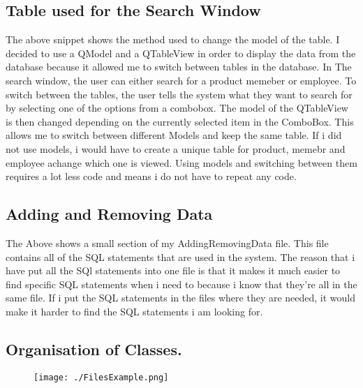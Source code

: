 \subsection{Table used for the Search Window}
\begin{figure}[H]
\end{figure}

The above snippet shows the method used to change the model of the table. I decided to use a QModel and a QTableView in order to display the data from the database because it allowed me to switch between tables in the database. In The search window, the user can either search for a product memeber or employee. To switch between the tables, the user tells the system what they want to search for by selecting one of the options from a combobox. The model of the QTableView is then changed depending on the currently selected item in the ComboBox. This allows me to switch between different Models and keep the same table. If i did not use models, i would have to create a unique table for product, memebr and employee achange which one is viewed. Using models and switching between them requires a lot less code and means i do not have to repeat any code.

\subsection{Adding and Removing Data}
\begin{figure}[H]
\end{figure}

The Above shows a small section of my AddingRemovingData file. This file contains all of the SQL statements that are used in the system. The reason that i have put all the SQl statements into one file is that it makes it much easier to find specific SQL statements when i need to because i know that they're all in the same file. If i put the SQL statements in the files where they are needed, it would make it harder to find the SQL statements i am looking for.

\subsection{Organisation of Classes.}
\begin{figure}[H]
    \texttt{[image: ./FilesExample.png]}
\end{figure}

